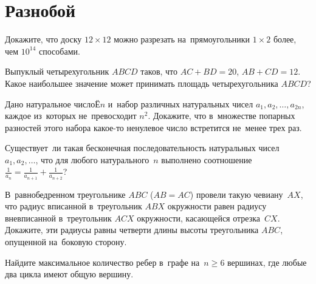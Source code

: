 
\section*{Разнобой}


\begin{problems}

\item
Докажите, что доску $12 \times 12$ можно разрезать на~прямоугольники
$1 \times 2$ более, чем $10^{14}$ способами.

\item
Выпуклый четырехугольник $ABCD$ таков, что $AC + BD = 20$, $AB + CD = 12$.
Какое наибольшее значение может принимать площадь четырехугольника $ABCD$?

\item
Дано натуральное числоЁ$n$ и~набор различных натуральных чисел
$a_1, a_2, \ldots, a_{2n}$, каждое из~которых не~превосходит $n^2$.
Докажите, что в~множестве попарных разностей этого набора какое-то ненулевое
число встретится не~менее трех раз.

\item
Существует~ли такая бесконечная последовательность натуральных чисел
$a_1, a_2, \ldots$, что для любого натурального~$n$ выполнено соотношение
\(
    \frac{1}{a_n}
=
    \frac{1}{a_{n+1}} + \frac{1}{a_{n+2}}
\)?

\item
В~равнобедренном треугольнике $ABC$ ($AB = AC$) провели такую чевиану~$AX$, что
радиус вписанной в~треугольник $ABX$ окружности равен радиусу вневписанной
в~треугольник $ACX$ окружности, касающейся отрезка~$CX$.
Докажите, эти радиусы равны четверти длины высоты треугольника $ABC$, опущенной
на~боковую сторону.

\item
Найдите максимальное количество ребер в~графе на~$n \geq 6$ вершинах, где любые
два цикла имеют общую вершину.

\end{problems}

